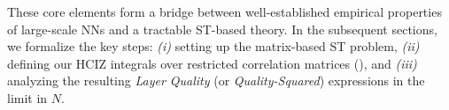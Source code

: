 \vspace*{1em}

These core elements form a bridge between well-established empirical properties of large-scale NNs 
and a tractable ST-based theory. In the subsequent sections, we formalize the key steps: 
\emph{(i)} setting up the matrix-based ST problem, \emph{(ii)} defining our HCIZ integrals 
over restricted correlation matrices (\ECS), and \emph{(iii)} analyzing the resulting 
\emph{Layer Quality} (or \emph{Quality-Squared}) expressions in the \LargeN limit in $N$.
